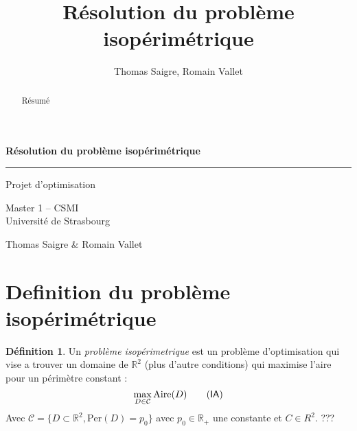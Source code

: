 \documentclass[10pt,a4paper]{article}
\title{Résolution du problème isopérimétrique}
\author{Thomas Saigre, Romain Vallet}
\newcommand{\R}{\mathbb{R}}
\newcommand{\C}{\mathcal{C}}
\newcommand{\A}{\mathrm{Aire}}
\newcommand{\p}{\mathrm{Per}}
\newcommand{\IA}{\textsf{IA}}
\theoremstyle{plain}
\theoremstyle{definition}
\newtheorem{defi}[thm]{Définition}
\begin{document}
\renewcommand{\proofname}{\textbf{Preuve}}



\thispagestyle{empty}



\begin{center}

{\LARGE \textsf{\textbf{Résolution du problème isopérimétrique\\}}}
\rule{\linewidth}{0.5mm}

\vspace{2\baselineskip}

{\Large Projet d'optimisation}

\vspace{\baselineskip}

{\Large Master 1 -- CSMI \\ \vspace{0.5\baselineskip} Université de Strasbourg}

\vspace{2\baselineskip}

{\sf \Large Thomas Saigre \& Romain Vallet}

\vspace{2\baselineskip}

\end{center}







\newpage

\begin{abstract}
Résumé
\end{abstract}





\section{Definition du problème isopérimétrique}

\begin{defi}
Un \emph{problème isopérimetrique} est un problème d'optimisation qui vise a trouver un domaine de $\R^2$ (plus d'autre conditions) qui maximise l'aire pour un périmètre constant :
\[\max_{D \in \C} \A(D) \label{ia}\tag{\IA}\]
Avec $\mathcal{C} = \{ D \subset\R^2, \p(D) = p_0 \}$ avec $p_0\in \R_+$ une constante et $C \in R^2$. ???


\end{defi}
\end{document}
